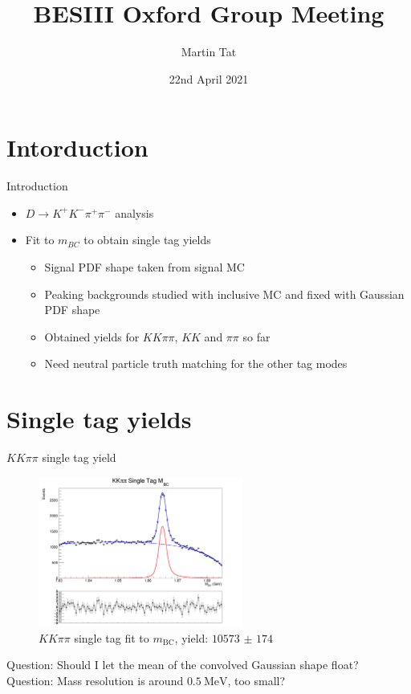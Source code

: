 \documentclass{beamer}
\title[BESIII Oxford]{BESIII Oxford Group Meeting}
\author{Martin Tat}
\institute{Oxford LHCb}
\date{22nd April 2021}
\begin{document}
\begin{frame}
  \titlepage
\end{frame}


\section{Intorduction}
\begin{frame}{Introduction}
  \begin{itemize}
    \setlength\itemsep{2em}
    \item{$D\to K^+K^-\pi^+\pi^-$ analysis}
    \item{Fit to $m_{BC}$ to obtain single tag yields}
    \begin{itemize}
      \setlength\itemsep{1.1em}
      \item{Signal PDF shape taken from signal MC}
      \item{Peaking backgrounds studied with inclusive MC and fixed with Gaussian PDF shape}
      \item{Obtained yields for $KK\pi\pi$, $KK$ and $\pi\pi$ so far}
      \item{Need neutral particle truth matching for the other tag modes}
    \end{itemize}
  \end{itemize}
\end{frame}

\section{Single tag yields}
\begin{frame}{$KK\pi\pi$ single tag yield}
  \begin{figure}
    \centering
    \includegraphics[width=0.6\textwidth]{KKpipiSingleTagMBCPlot.png}
    \caption{$KK\pi\pi$ single tag fit to $m_\text{BC}$, yield: $\SI{10573(174)}{}$}
  \end{figure}
  Question: Should I let the mean of the convolved Gaussian shape float?  \\
  Question: Mass resolution is around $\SI{0.5}{\mega\eV}$, too small?
\end{frame}
\end{document}

